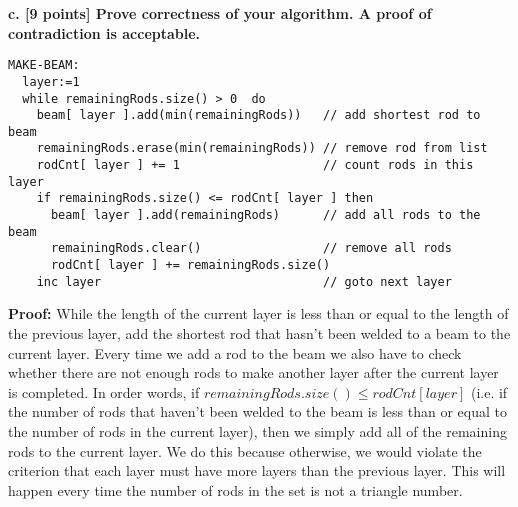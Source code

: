 \documentclass[12pt]{article}
\begin{document}
\newpage
\noindent \textbf{c. [9 points] Prove correctness of your algorithm. A proof of contradiction is acceptable.}
\begin{lstlisting}[frame=single]
MAKE-BEAM:
  layer:=1                                                        
  while remainingRods.size() > 0  do 
    beam[ layer ].add(min(remainingRods))   // add shortest rod to beam
    remainingRods.erase(min(remainingRods)) // remove rod from list
    rodCnt[ layer ] += 1                    // count rods in this layer
    if remainingRods.size() <= rodCnt[ layer ] then
      beam[ layer ].add(remainingRods)      // add all rods to the beam
      remainingRods.clear()                 // remove all rods 
      rodCnt[ layer ] += remainingRods.size()
    inc layer                               // goto next layer
\end{lstlisting}

\textbf{Proof: } While the length of the current layer is less than or
equal to the length of the previous layer, add the shortest rod that hasn't 
been welded to a beam to the current layer. 
Every time we add a rod to the beam we also have to check whether there 
are not enough rods to make another layer after the current layer is completed. 
In order words, if $ remainingRods.size() \le rodCnt[ layer ] $
(i.e. if the number of rods that haven't been welded to the beam is less than 
or equal to the number of rods in the current layer), 
then we simply add all of the 
remaining rods to the current layer. We do this because otherwise, we would 
violate the criterion that each layer must have more layers than the 
previous layer. 
This will happen every time the number of rods in the set is not a triangle 
number.
\end{document}
